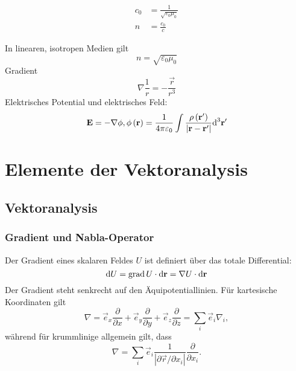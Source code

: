 \begin{align*}
	c_{0} & =\frac{1}{\sqrt{\varepsilon _{0}\mu _{0}}} \\
	n     & =\frac{c_{0}}{c}
\end{align*}

In linearen, isotropen Medien gilt
\begin{equation*}
	n=\sqrt{\varepsilon _{0}\mu _{0}}
\end{equation*}
Gradient
\begin{equation*}
	\nabla \frac{1}{r}=-\frac{\vec {r}}{r^{3}}
\end{equation*}
Elektrisches Potential und elektrisches Feld:
\begin{equation*}
	\mathbf{E}=-\nabla \phi , \phi \left(\mathbf{r}\right)=\frac{1}{4\pi \varepsilon _{0}}\int \frac{\rho \left(\mathbf{r}'\right)}{\left| \mathbf{r}-\mathbf{r}'\right| }\text{d} ^{3}\mathbf{r}'
\end{equation*}
\chapter{Elemente der Vektoranalysis\label{ref-004}}

\section{Vektoranalysis\label{ref-005}}

\subsection{Gradient und Nabla-Operator\label{ref-006}}

Der Gradient eines skalaren Feldes $U$ ist definiert über das totale Differential:
\begin{equation*}
	\text{d} U=\operatorname{grad} U\cdot \text{d} \mathbf{r}=\nabla U\cdot \text{d} \mathbf{r}
\end{equation*}
Der Gradient steht senkrecht auf den Äquipotentiallinien. Für kartesische Koordinaten gilt
\begin{equation*}
	\nabla =\vec {e}_{x}\frac{\partial }{\partial x}+\vec {e}_{y}\frac{\partial }{\partial y}+\vec {e}_{z}\frac{\partial }{\partial z}=\sum _{i}\vec {e}_{i}\nabla _{i},
\end{equation*}
während für krummlinige allgemein gilt, dass
\begin{equation*}
	\nabla =\sum _{i}\vec {e}_{i}\frac{1}{\left| \partial \vec {r}/\partial x_{i}\right| }\frac{\partial }{\partial x_{i}}.
\end{equation*}
